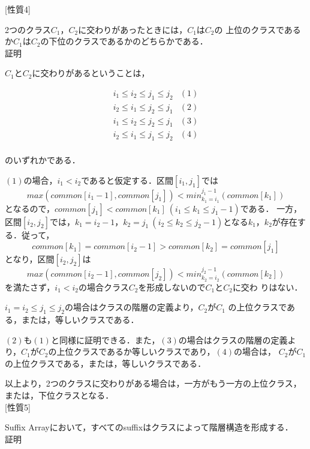 [性質4]\par
2つのクラス$C_1$，$C_2$に交わりがあったときには，$C_1$は$C_2$の
上位のクラスであるか$C_1$は$C_2$の下位のクラスであるかのどちらかである．\\


証明\par

$C_1$と$C_2$に交わりがあるということは，

 \begin{center}
  \[
   \begin{array}{lr}
    i_1 \leq i_2 \leq j_1 \leq j_2 & (1)\\
    i_2 \leq i_1 \leq j_2 \leq j_1 & (2)\\
    i_1 \leq i_2 \leq j_2 \leq j_1 & (3)\\
    i_2 \leq i_1 \leq j_1 \leq j_2 & (4)\\
   \end{array}
  \]
 \end{center}

のいずれかである．\par
$(1)$の場合，$i_1<i_2$であると仮定する．区間$[i_1,j_1]$では
$$ max(common[i_1-1],common[j_1]) < min_{k_1=i_1}^{j_1-1}(common[k_1]) $$
となるので，$common[j_1]<common[k_1]\ (i_1 \leq k_1 \leq j_1-1)$である．
一方，区間$[i_2,j_2]$では，$k_1=i_2-1$，$k_2=j_1\ (i_2 \leq k_2
\leq j_2-1)$となる$k_1$，$k_2$が存在する．従って，
$$common[k_1]=common[i_2-1]>common[k_2]=common[j_1]$$
となり，区間$[i_2,j_2]$は
$$ max(common[i_2-1],common[j_2]) < min_{k_2=i_2}^{j_2-1}(common[k_2]) $$
を満たさず，$i_1<i_2$の場合クラス$C_2$を形成しないので$C_1$と$C_2$に交わ
りはない．\par
$i_1=i_2 \leq j_1 \leq j_2$の場合はクラスの階層の定義より，$C_2$が$C_1$
の上位クラスである，または，等しいクラスである．\par
$(2)$も$(1)$と同様に証明できる．また，$(3)$の場合はクラスの階層の定義よ
り，$C_1$が$C_2$の上位クラスであるか等しいクラスであり，$(4)$の場合は，
$C_2$が$C_1$の上位クラスである，または，等しいクラスである．\par
以上より，2つのクラスに交わりがある場合は，一方がもう一方の上位クラス，
または，下位クラスとなる．\\


[性質5]\par
Suffix Arrayにおいて，すべてのsuffixはクラスによって階層構造を形成する．\\


証明\par

